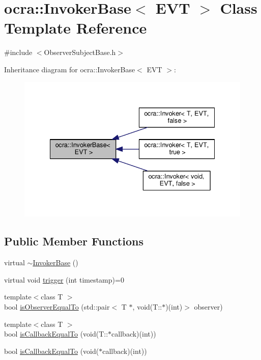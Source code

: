 \hypertarget{classocra_1_1InvokerBase}{}\section{ocra\+:\+:Invoker\+Base$<$ E\+VT $>$ Class Template Reference}
\label{classocra_1_1InvokerBase}


{\ttfamily \#include $<$Observer\+Subject\+Base.\+h$>$}



Inheritance diagram for ocra\+:\+:Invoker\+Base$<$ E\+VT $>$\+:
\nopagebreak
\begin{figure}[H]
\begin{center}
\leavevmode
\includegraphics[width=335pt]{d8/dc5/classocra_1_1InvokerBase__inherit__graph}
\end{center}
\end{figure}
\subsection*{Public Member Functions}
\begin{DoxyCompactItemize}
\item 
virtual \hyperlink{classocra_1_1InvokerBase_aa02504b95fda47269f5c42c4c7650a13}{$\sim$\+Invoker\+Base} ()
\item 
virtual void \hyperlink{classocra_1_1InvokerBase_ae4d7537a1b2c0aa9b5188c5da8423289}{trigger} (int timestamp)=0
\end{DoxyCompactItemize}
{\bf }\par
\begin{DoxyCompactItemize}
\item 
{\footnotesize template$<$class T $>$ }\\bool \hyperlink{classocra_1_1InvokerBase_a1ba940e9b5c9559fd7904dda940d2501}{is\+Observer\+Equal\+To} (std\+::pair$<$ T $\ast$, void(T\+::$\ast$)(int)$>$ observer)
\item 
{\footnotesize template$<$class T $>$ }\\bool \hyperlink{classocra_1_1InvokerBase_a4876ec9f3321e19fda7eb7f40befdf8e}{is\+Callback\+Equal\+To} (void(T\+::$\ast$callback)(int))
\item 
bool \hyperlink{classocra_1_1InvokerBase_a89f5d1ce29dcec8811e41e1e5992350d}{is\+Callback\+Equal\+To} (void($\ast$callback)(int))
\end{DoxyCompactItemize}

